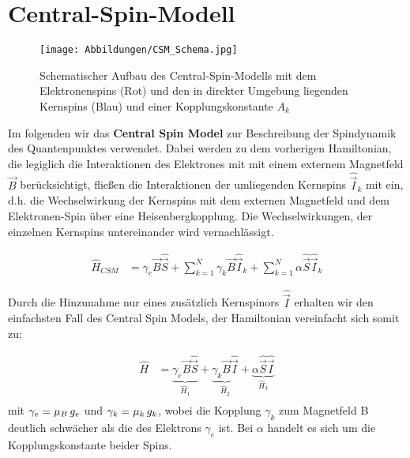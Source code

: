 \documentclass[12pt]{article}
\begin{document}
\section{Central-Spin-Modell }
\begin{wrapfigure}{r}{0.4\textwidth}
    \centering
    \texttt{[image: Abbildungen/CSM\_Schema.jpg]}
    \caption{Schematischer Aufbau des Central-Spin-Modells mit dem Elektronenspins (Rot) und den in direkter Umgebung liegenden 
    Kernspins (Blau) und einer Kopplungskonstante $A_k$}
    \label{fig:CSM}
\end{wrapfigure}
Im folgenden wir das \textbf{Central Spin Model} zur Beschreibung der Spindynamik des Quantenpunktes verwendet. Dabei werden 
zu dem vorherigen Hamiltonian, die legiglich die Interaktionen des Elektrones mit mit einem externem Magnetfeld $\vec{B}$ berücksichtigt, 
fließen die Interaktionen der umliegenden Kernspins $\hat{\vec{I}}_k$ mit ein, d.h. die Wechselwirkung der Kernspins mit dem externen 
Magnetfeld und dem Elektronen-Spin über eine Heisenbergkopplung. Die Wechselwirkungen, der einzelnen Kernspins untereinander wird 
vernachlässigt.

\begin{align}
    \hat{H}_{CSM} &= \gamma_e \vec{B}\hat{\vec{S}} +  \sum_{k=1}^{N}\gamma_k\vec{B}\hat{\vec{I}}_k + \sum_{k=1}^{N}\alpha \hat{\vec{S}}\hat{\vec{I}}_k
\end{align}




\noindent Durch die Hinzunahme nur eines zusätzlich Kernspinors $\hat{\vec{I}}$ erhalten wir den einfachsten Fall des Central 
Spin Models, der Hamiltonian vereinfacht sich somit zu:

\begin{align}
    \hat{H} &= \underbrace{\gamma_e \vec{B}\hat{\vec{S}}}_{\hat{H}_1} + \underbrace{\gamma_k \vec{B}\hat{\vec{I}}}_{\hat{H}_2} + \underbrace{\alpha \hat{\vec{S}}\hat{\vec{I}}}_{\hat{H}_3}\\
\end{align}
mit $\gamma_e=\mu_B\thinspace g_e$ und  $\gamma_k=\mu_k\thinspace g_k$, wobei die Kopplung $\gamma_k$ zum Magnetfeld B deutlich 
schwächer als die des Elektrons $\gamma_e$ ist. Bei $\alpha$ handelt es sich um die Kopplungskonstante beider Spins.





\end{document}
